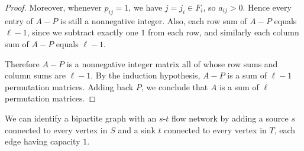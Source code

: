 \documentclass[11pt, a4paper]{ctexrep}
\begin{document}
\begin{proof}
    Moreover, whenever $p_{ij}=1$, we have $j=j_i\in F_i$, so $a_{ij}>0$.
    Hence every entry of $A-P$ is still a nonnegative integer.
    Also, each row sum of $A-P$ equals $\ell-1$, since we subtract exactly one $1$ from
    each row, and similarly each column sum of $A-P$ equals $\ell-1$.

    Therefore $A-P$ is a nonnegative integer matrix all of whose row sums and column
    sums are $\ell-1$. By the induction hypothesis, $A-P$ is a sum of $\ell-1$
    permutation matrices. Adding back $P$, we conclude that $A$ is a sum of $\ell$
    permutation matrices.
\end{proof}

We can identify a bipartite graph with an $s$-$t$ flow network by adding a source $s$ connected to every vertex in $S$ and a sink $t$ connected to every vertex in $T$, each edge having capacity $1$.
\end{document}
